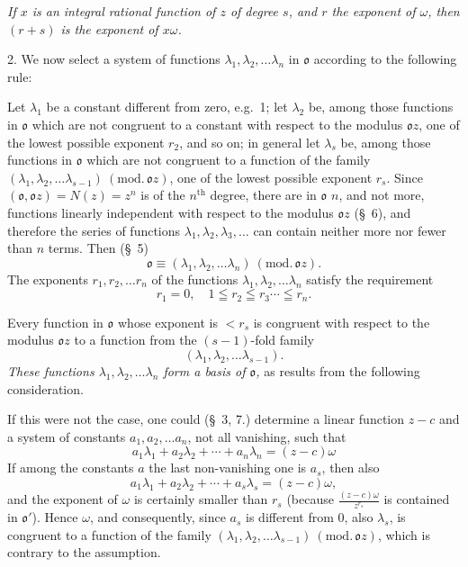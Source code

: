 \documentclass{article}
\begin{document}
\emph{If $x$ is an integral rational function of $z$ of degree $s$, and $r$ the exponent of $\omega$, then $(r+s)$ is the exponent of $x\omega$.}

2. We now select a system of functions $\lambda_{1}, \lambda_{2}, \ldots \lambda_{n}$ in $\mathfrak{o}$ according to the following rule:

Let $\lambda_{1}$ be a constant different from zero, e.g.\ 1; let $\lambda_{2}$ be, among those functions in $\mathfrak{o}$ which are not congruent to a constant with respect to the modulus $\mathfrak{o}z$, one of the lowest possible exponent $r_{2}$, and so on; in general let $\lambda_{s}$ be, among those functions in $\mathfrak{o}$ which are not congruent to a function of the family $(\lambda_{1}, \lambda_{2}, \ldots \lambda_{s-1})\ (\text{mod.}\,\mathfrak{o}z)$, one of the lowest possible exponent $r_{s}$. Since $(\mathfrak{o}, \mathfrak{o}z) = N(z) = z^{n}$ is of the $n^{\text{th}}$ degree, there are in $\mathfrak{o}$ $n$, and not more, functions linearly independent with respect to the modulus $\mathfrak{o}z$ (§~6), and therefore the series of functions $\lambda_{1}, \lambda_{2}, \lambda_{3}, \ldots$ can contain neither more nor fewer than $n$ terms. Then (§~5)
\[ \mathfrak{o} \equiv (\lambda_{1}, \lambda_{2}, \ldots \lambda_{n})\ (\text{mod.}\,\mathfrak{o}z). \]
The exponents $r_{1}, r_{2}, \ldots r_{n}$ of the functions $\lambda_{1}, \lambda_{2}, \ldots \lambda_{n}$ satisfy the requirement
\[ r_{1} = 0, \quad 1 \leqq r_{2} \leqq r_{3} \cdots \leqq r_{n}. \]

Every function in $\mathfrak{o}$ whose exponent is $< r_{s}$ is congruent with respect to the modulus $\mathfrak{o}z$ to a function from the $(s-1)$-fold family
\[ (\lambda_{1}, \lambda_{2}, \ldots \lambda_{s-1}). \]
\emph{These functions $\lambda_{1}, \lambda_{2}, \ldots \lambda_{n}$ form a basis of $\mathfrak{o}$,} as results from the following consideration.

If this were not the case, one could (§~3, 7.) determine a linear function $z-c$ and a system of constants $a_{1}, a_{2}, \ldots a_{n}$, not all vanishing, such that
\[ a_{1}\lambda_{1} + a_{2}\lambda_{2} + \cdots + a_{n}\lambda_{n} = (z-c)\omega \]
If among the constants $a$ the last non-vanishing one is $a_{s}$, then also
\[ a_{1}\lambda_{1} + a_{2}\lambda_{2} + \cdots + a_{s}\lambda_{s} = (z-c)\omega, \]
and the exponent of $\omega$ is certainly smaller than $r_{s}$ (because $\frac{(z-c)\omega}{z^{r_{s}}}$ is contained in $\mathfrak{o}'$). Hence $\omega$, and consequently, since $a_{s}$ is different from 0, also $\lambda_{s}$, is congruent to a function of the family $(\lambda_{1}, \lambda_{2}, \ldots \lambda_{s-1})\ (\text{mod.}\,\mathfrak{o}z)$, which is contrary to the assumption.
\end{document}
